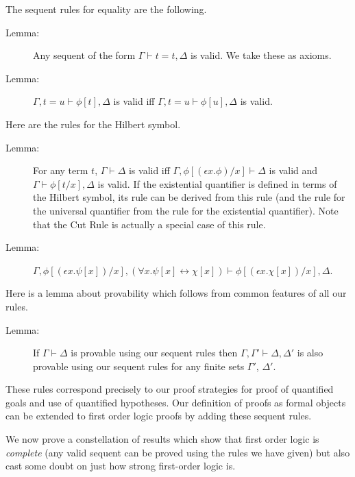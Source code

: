 \documentclass[12pt]{book}
\begin{document}
The sequent rules for equality are the following.

\begin{description}

\item[Lemma:]  Any sequent of the form $\Gamma\vdash t=t,\Delta$
is valid.  We take these as axioms.

\item[Lemma:]  $\Gamma,t=u\vdash \phi[t],\Delta$ is valid iff
$\Gamma,t=u\vdash \phi[u],\Delta$ is valid.

\end{description}

Here are the rules for the Hilbert symbol.

\begin{description}

\item[Lemma:] For any term $t$, $\Gamma \vdash \Delta$ is valid iff
$\Gamma, \phi[(\epsilon x.\phi)/x] \vdash \Delta$ is valid and $\Gamma
\vdash \phi[t/x],\Delta$ is valid.  If the existential quantifier is
defined in terms of the Hilbert symbol, its rule can be derived from
this rule (and the rule for the universal quantifier from the rule for
the existential quantifier).  Note that the Cut Rule is actually a
special case of this rule.

\item[Lemma:] $\Gamma,\phi[(\epsilon x.\psi[x])/x],(\forall x.\psi[x]
\leftrightarrow \chi[x]) \vdash \phi[(\epsilon x.\chi[x])/x],\Delta$.

\end{description}

Here is a lemma about provability which follows from common features
of all our rules.

\begin{description}

\item[Lemma:] If $\Gamma\vdash\Delta$ is provable using our sequent
rules then $\Gamma,\Gamma' \vdash \Delta,\Delta'$ is also provable
using our sequent rules for any finite sets $\Gamma'$, $\Delta'$.

\end{description}

These rules correspond precisely to our proof strategies for proof of
quantified goals and use of quantified hypotheses.  Our definition of
proofs as formal objects can be extended to first order logic proofs
by adding these sequent rules.

We now prove a constellation of results which show that first order
logic is {\em complete\/} (any valid sequent can be proved using the
rules we have given) but also cast some doubt on just how strong
first-order logic is.
\end{document}
